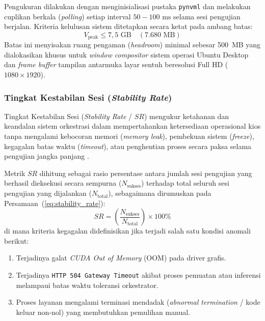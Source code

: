 Pengukuran dilakukan dengan menginisialisasi pustaka \texttt{pynvml} dan melakukan cuplikan berkala (\textit{polling}) setiap interval $50 - 100\text{ ms}$ selama sesi pengujian berjalan. Kriteria kelulusan sistem ditetapkan secara ketat pada ambang batas:
\begin{equation}
    V_{\text{peak}} \le 7{,}5\text{ GB} \quad (7.680\text{ MB})
    \label{eq:vpeak_constraint}
\end{equation}
Batas ini menyisakan ruang pengaman (\textit{headroom}) minimal sebesar 500~MB yang dialokasikan khusus untuk \textit{window compositor} sistem operasi Ubuntu Desktop dan \textit{frame buffer} tampilan antarmuka layar sentuh beresolusi Full HD ($1080 \times 1920$).

\subsubsection{Tingkat Kestabilan Sesi (\textit{Stability Rate})}
Tingkat Kestabilan Sesi (\textit{Stability Rate} / $SR$) mengukur ketahanan dan keandalan sistem orkestrasi dalam mempertahankan ketersediaan operasional kios tanpa mengalami kebocoran memori (\textit{memory leak}), pembekuan sistem (\textit{freeze}), kegagalan batas waktu (\textit{timeout}), atau penghentian proses secara paksa selama pengujian jangka panjang \cite{velepucha2023survey, chiang2023management}.

Metrik $SR$ dihitung sebagai rasio persentase antara jumlah sesi pengujian yang berhasil dieksekusi secara sempurna ($N_{\text{sukses}}$) terhadap total seluruh sesi pengujian yang dijalankan ($N_{\text{total}}$), sebagaimana dirumuskan pada Persamaan~(\ref{eq:stability_rate}):
\begin{equation}
    SR = \left( \frac{N_{\text{sukses}}}{N_{\text{total}}} \right) \times 100\%
    \label{eq:stability_rate}
\end{equation}
di mana kriteria kegagalan didefinisikan jika terjadi salah satu kondisi anomali berikut:
\begin{enumerate}
    \item Terjadinya galat \textit{CUDA Out of Memory} (OOM) pada driver grafis.
    \item Terjadinya \texttt{HTTP 504 Gateway Timeout} akibat proses pemuatan atau inferensi melampaui batas waktu toleransi orkestrator.
    \item Proses layanan mengalami terminasi mendadak (\textit{abnormal termination} / kode keluar non-nol) yang membutuhkan pemulihan manual.
\end{enumerate}

